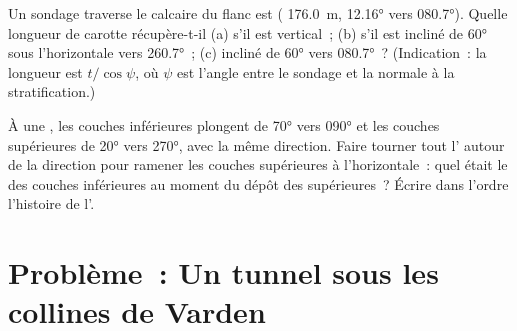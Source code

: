\begin{exercise}[$\star\star\star$]\label{exo:b1:cross-sections:11}
Un sondage traverse le calcaire du flanc est ( \qty{176.0}{m},
 \ang{12.16} vers \ang{080.7}). Quelle longueur de carotte récupère-t-il
(a) s'il est vertical~; (b) s'il est incliné de \ang{60} sous l'horizontale vers
\ang{260.7}~; (c) incliné de \ang{60} vers \ang{080.7}~? (Indication~: la
longueur est $t/\cos\psi$, où $\psi$ est l'angle entre le sondage et la normale
à la stratification.)
\end{exercise}

\begin{exercise}[$\star\star\star$]\label{exo:b1:cross-sections:12}
À une , les couches inférieures plongent de \ang{70} vers
\ang{090} et les couches supérieures de \ang{20} vers \ang{270}, avec la même
direction. Faire tourner tout l' autour de la direction pour ramener
les couches supérieures à l'horizontale~: quel était le  des couches
inférieures au moment du dépôt des supérieures~? Écrire dans l'ordre l'histoire
de l'.
\end{exercise}

\section{Problème~: Un tunnel sous les collines de Varden}

